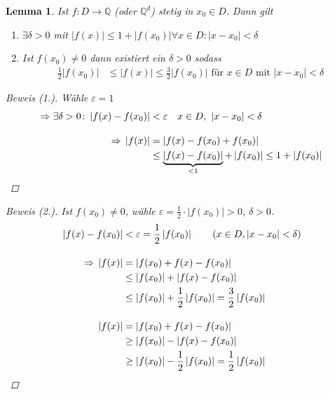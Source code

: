 \documentclass[11pt, twoside, a4paper]{article}
\theoremstyle{plain}
\newtheorem{lemma}[blockelement]{Lemma}
\newcommand{\abs}[1]{\left|#1\right|}
\newcommand{\impl}[0]{\Rightarrow{}}
\newcommand{\fromto}{\rightarrow{}}
\newcommand{\K}{\mathbb{Q}}
\begin{document}
    \begin{lemma} %
        \label{lemma:abschaetzung-stetigkeit}
        Ist $f:D\fromto\K$ (oder $\K^d$) stetig in $x_0\in D$. Dann gilt
        \begin{enumerate}[label=\arabic*.]
            \item $\exists \delta > 0$ mit $\abs{f(x)}\leq 1+\abs{f(x_0)}$\quad$\forall x\in D\colon \abs{x-x_0} < \delta$
            \item Ist $f(x_0) \neq 0$ dann existiert ein $\delta>0$ sodass
            \begin{align*}
                \frac{1}{2}\abs{f(x_0)} &\leq \abs{f(x)} \leq \frac{3}{2} \abs{f(x_0)} \text{ für } x\in D \text{ mit } \abs{x-x_0} < \delta
            \end{align*}
        \end{enumerate}

        \begin{proof}[Beweis (1.)]
            Wähle $\varepsilon = 1$
            \begin{align*}
                \impl \exists\delta > 0\colon \abs{f(x)-f(x_0)} &< \varepsilon\quad x\in D,~\abs{x-x_0} < \delta\\[10pt]
                \impl \abs{f(x)} &= \abs{f(x)-f(x_0)+f(x_0)}\\
                &\leq \underbrace{\abs{f(x)-f(x_0)}}_{< 1} + \abs{f(x_0)}\leq 1 + \abs{f(x_0)}\qedhere
            \end{align*}
        \end{proof}
        \begin{proof}[Beweis (2.)]
            Ist $f(x_0) \neq 0$, wähle $\varepsilon = \frac{1}{2}\cdot\abs{f(x_0)} > 0$, $\delta > 0$.
            \begin{align*}
                \abs{f(x)-f(x_0)} &< \varepsilon = \frac{1}{2} \abs{f(x_0)} \tag{$x\in D, \abs{x-x_0} < \delta$}\\[10pt]
                \impl \abs{f(x)} &= \abs{f(x_0)+f(x)-f(x_0)}\\
                &\leq \abs{f(x_0)} + \abs{f(x) - f(x_0)}\\
                &\leq \abs{f(x_0)}+\frac{1}{2}\abs{f(x_0)} = \frac{3}{2}\abs{f(x_0)}\\[10pt]
                \abs{f(x)} &= \abs{f(x_0)+f(x)-f(x_0)}\\
                &\geq \abs{f(x_0)} - \abs{f(x)-f(x_0)}\\
                &\geq \abs{f(x_0)} - \frac{1}{2} \abs{f(x_0)} = \frac{1}{2}\abs{f(x_0)}\qedhere
            \end{align*}
        \end{proof}
    \end{lemma}
\end{document}
